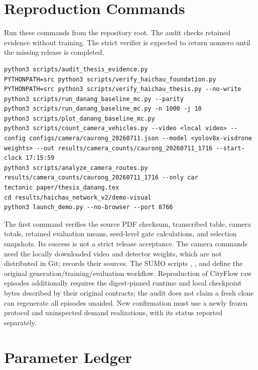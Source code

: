 \documentclass[12pt,a4paper]{report}
\begin{document}
\chapter{Reproduction Commands}\label{app:repro}
Run these commands from the repository root. The audit checks retained evidence without training. The strict verifier is expected to return nonzero until the missing release is completed.
\begin{lstlisting}[basicstyle=\ttfamily\small,breaklines=true]
python3 scripts/audit_thesis_evidence.py
PYTHONPATH=src python3 scripts/verify_haichau_foundation.py
PYTHONPATH=src python3 scripts/verify_haichau_thesis.py --no-write
python3 scripts/run_danang_baseline_mc.py --parity
python3 scripts/run_danang_baseline_mc.py -n 1000 -j 10
python3 scripts/plot_danang_baseline_mc.py
python3 scripts/count_camera_vehicles.py --video <local video> --config configs/camera/caurong_20260711.json --model <yolov8x-visdrone weights> --out results/camera_counts/caurong_20260711_1716 --start-clock 17:15:59
python3 scripts/analyze_camera_routes.py results/camera_counts/caurong_20260711_1716 --only car
tectonic paper/thesis_danang.tex
cd results/haichau_network_v2/demo-visual
python3 launch_demo.py --no-browser --port 8766
\end{lstlisting}
The first command verifies the source PDF checksum, transcribed table, camera totals, retained evaluation means, seed-level gate calculations, and selection snapshots. Its success is not a strict release acceptance. The camera commands need the locally downloaded video and detector weights, which are not distributed in Git;  records their sources. The SUMO scripts , , and  define the original generation/training/evaluation workflow. Reproduction of CityFlow raw episodes additionally requires the digest-pinned runtime and local checkpoint bytes described by their original contracts; the audit does not claim a fresh clone can regenerate all episodes unaided. New confirmation must use a newly frozen protocol and uninspected demand realizations, with its status reported separately.

\chapter{Parameter Ledger}
\end{document}
